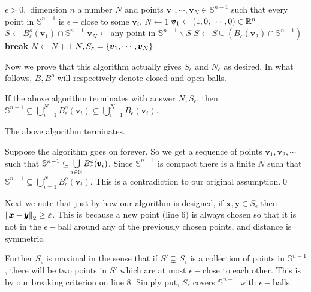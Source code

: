 \begin{enumerate}[leftmargin=*, label=(\alph*)]
\begin{algorithmic}[1]
\Require $\epsilon>0,$ dimension $n$
\Ensure a number $N$ and points $\pmb v_{1},\cdots,\pmb v_{N}\in \mathbb S^{n-1}$ such that every point in $\mathbb S^{n-1}$ is $\epsilon-$close to some $\pmb v_{i}$.
\Begin
\State $N\gets 1$
\State $\pmb v_{1} \gets (1,0,\cdots,0)\in\mathbb{R}^{n}$
\State $S \gets B_{\epsilon}^{o}(\pmb v_{1})\cap \mathbb S^{n-1}$ 
    \State $\pmb v_{N} \gets $any point in $\mathbb S^{n-1}\smallsetminus S$
    \State $S \gets S\cup (B_{\epsilon}(\pmb v_{2})\cap \mathbb S^{n-1})$
     
    	\State \textbf{break}
	\Else
		\State $N \gets N+1$
	\EndIf
\EndWhile 
\State \Return $N,S_{\varepsilon} = \left\{\pmb v_{1},\cdots,\pmb v_{N}\right\}$
\End
\end{algorithmic}

Now we prove that this algorithm actually gives $S_{\epsilon}$ and $N_{\epsilon}$ as desired. In what follows, $B,B^{o}$ will respectively denote closed and open balls.

If the above algorithm terminates with answer $N,S_{\epsilon}$, then $\mathbb S^{n-1}\subseteq \bigcup\limits_{i=1}^{N}B_{\epsilon}^{o}(\pmb v_{i}) \subseteq \bigcup\limits_{i=1}^{N}B_{\epsilon}(\pmb v_{i})$.

\begin{cl}
The above algorithm terminates.
\end{cl}
\begin{pf}
Suppose the algorithm goes on forever. So we get a sequence of points $\pmb v_{1}, \pmb v_{2},\cdots$ such that $\mathbb S^{n-1}\subseteq \bigcup\limits_{i\in\mathbb{N}}B_{\varepsilon}^{o}(\pmb v_{i})$. Since $\mathbb S^{n-1}$ is compact there is a finite $N$ such that $\mathbb S^{n-1}\subseteq \bigcup\limits_{i=1}^{N}B_{\epsilon}^{o}(\pmb v_{i})$. This is a contradiction to our original assumption.\qed
\end{pf}

Next we note that just by how our algorithm is designed, if $\pmb x,\pmb y\in S_{\epsilon}$ then $\left\lVert \pmb x-\pmb y \right\rVert_{2}\ge \varepsilon$. This is because a new point (line $6$) is always chosen so that it is not in the $\epsilon-$ball around any of the previously chosen points, and distance is symmetric.

Further $S_{\epsilon}$ is maximal in the sense that if $S'\supsetneq S_{\epsilon}$ is a collection of points in $\mathbb S^{n-1}$, there will be two points in $S'$ which are at most $\epsilon-$close to each other. This is by our breaking criterion on line $8$. Simply put, $S_{\epsilon}$ covers $\mathbb S^{n-1}$ with $\epsilon-$balls.


\end{enumerate}
